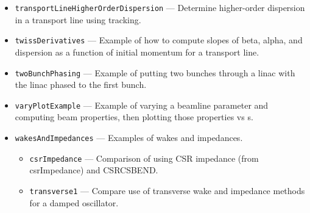 \begin{itemize}
\item \verb|transportLineHigherOrderDispersion| --- 
 Determine higher-order dispersion in a transport line using tracking. 

\item \verb|twissDerivatives| --- 
 Example of how to compute slopes of beta, alpha, and dispersion as a function of initial momentum for a transport line. 

\item \verb|twoBunchPhasing| --- 
 Example of putting two bunches through a linac with the linac phased to the first bunch. 

\item \verb|varyPlotExample| --- 
 Example of varying a beamline parameter and computing beam properties, then plotting those properties vs s. 

\item \verb|wakesAndImpedances| --- 
Examples of wakes and impedances.

\begin{itemize}
\item \verb|csrImpedance| --- 
Comparison of using CSR impedance (from csrImpedance) and CSRCSBEND.

\item \verb|transverse1| --- 
Compare use of transverse wake and impedance methods for a damped oscillator.

\end{itemize}
\end{itemize}

